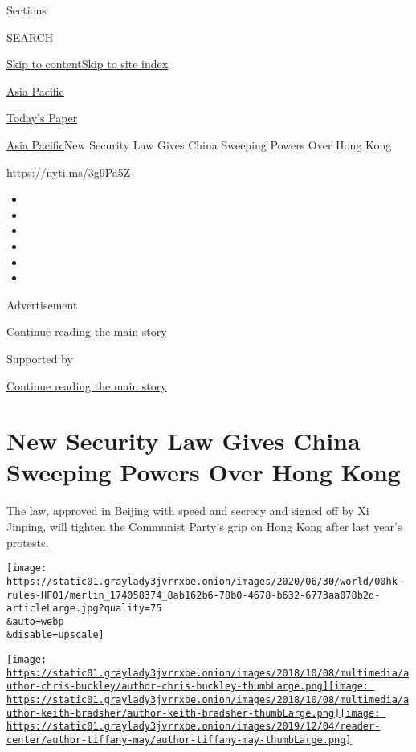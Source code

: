 Sections

SEARCH

\protect\hyperlink{site-content}{Skip to
content}\protect\hyperlink{site-index}{Skip to site index}

\href{https://www.nytimes3xbfgragh.onion/section/world/asia}{Asia
Pacific}

\href{https://myaccount.nytimes3xbfgragh.onion/auth/login?response_type=cookie\&client_id=vi}{}

\href{https://www.nytimes3xbfgragh.onion/section/todayspaper}{Today's
Paper}

\href{/section/world/asia}{Asia Pacific}\textbar{}New Security Law Gives
China Sweeping Powers Over Hong Kong

\href{https://nyti.ms/3g9Pa5Z}{https://nyti.ms/3g9Pa5Z}

\begin{itemize}
\item
\item
\item
\item
\item
\item
\end{itemize}

Advertisement

\protect\hyperlink{after-top}{Continue reading the main story}

Supported by

\protect\hyperlink{after-sponsor}{Continue reading the main story}

\hypertarget{new-security-law-gives-china-sweeping-powers-over-hong-kong}{%
\section{New Security Law Gives China Sweeping Powers Over Hong
Kong}\label{new-security-law-gives-china-sweeping-powers-over-hong-kong}}

The law, approved in Beijing with speed and secrecy and signed off by Xi
Jinping, will tighten the Communist Party's grip on Hong Kong after last
year's protests.

\texttt{[image: https://static01.graylady3jvrrxbe.onion/images/2020/06/30/world/00hk-rules-HFO1/merlin\_174058374\_8ab162b6-78b0-4678-b632-6773aa078b2d-articleLarge.jpg?quality=75\\\&auto=webp\\\&disable=upscale]}

\href{https://www.nytimes3xbfgragh.onion/by/chris-buckley}{\texttt{[image: https://static01.graylady3jvrrxbe.onion/images/2018/10/08/multimedia/author-chris-buckley/author-chris-buckley-thumbLarge.png]}}\href{https://www.nytimes3xbfgragh.onion/by/keith-bradsher}{\texttt{[image: https://static01.graylady3jvrrxbe.onion/images/2018/10/08/multimedia/author-keith-bradsher/author-keith-bradsher-thumbLarge.png]}}\href{https://www.nytimes3xbfgragh.onion/by/tiffany-may}{\texttt{[image: https://static01.graylady3jvrrxbe.onion/images/2019/12/04/reader-center/author-tiffany-may/author-tiffany-may-thumbLarge.png]}}

